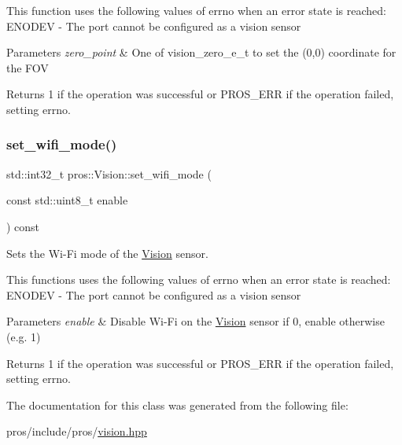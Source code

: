 This function uses the following values of errno when an error state is reached\+: E\+N\+O\+D\+EV -\/ The port cannot be configured as a vision sensor


\begin{DoxyParams}{Parameters}
{\em zero\+\_\+point} & One of vision\+\_\+zero\+\_\+e\+\_\+t to set the (0,0) coordinate for the F\+OV\\
\hline
\end{DoxyParams}
\begin{DoxyReturn}{Returns}
1 if the operation was successful or P\+R\+O\+S\+\_\+\+E\+RR if the operation failed, setting errno. 
\end{DoxyReturn}
\mbox{\label{classpros_1_1Vision_aa41af827ad6f9d6c050ca28c51d173ad}} 
\subsubsection{\texorpdfstring{set\+\_\+wifi\+\_\+mode()}{set\_wifi\_mode()}}
{\footnotesize\ttfamily std\+::int32\+\_\+t pros\+::\+Vision\+::set\+\_\+wifi\+\_\+mode (\begin{DoxyParamCaption}\item[{const std\+::uint8\+\_\+t}]{enable }\end{DoxyParamCaption}) const}



Sets the Wi-\/\+Fi mode of the \hyperlink{classpros_1_1Vision}{Vision} sensor. 

This functions uses the following values of errno when an error state is reached\+: E\+N\+O\+D\+EV -\/ The port cannot be configured as a vision sensor


\begin{DoxyParams}{Parameters}
{\em enable} & Disable Wi-\/\+Fi on the \hyperlink{classpros_1_1Vision}{Vision} sensor if 0, enable otherwise (e.\+g. 1)\\
\hline
\end{DoxyParams}
\begin{DoxyReturn}{Returns}
1 if the operation was successful or P\+R\+O\+S\+\_\+\+E\+RR if the operation failed, setting errno. 
\end{DoxyReturn}


The documentation for this class was generated from the following file\+:\begin{DoxyCompactItemize}
\item 
pros/include/pros/\hyperlink{vision_8hpp}{vision.\+hpp}\end{DoxyCompactItemize}
